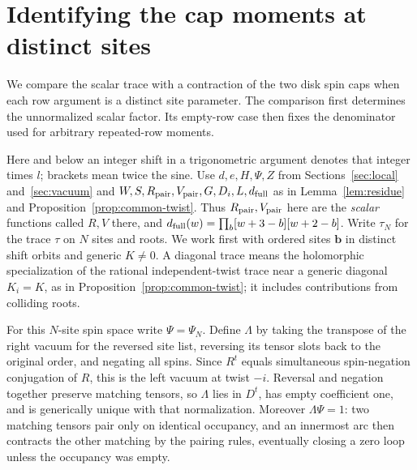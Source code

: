 \section{Identifying the cap moments at distinct sites}\label{sec:site-moments}

We compare the scalar trace with a contraction of the two disk spin caps when each row argument is a distinct site parameter. The comparison first determines the unnormalized scalar factor. Its empty-row case then fixes the denominator used for arbitrary repeated-row moments.

Here and below an integer shift in a trigonometric argument denotes that integer times \(l\); brackets mean twice the sine. Use \(d,e,H,\Psi,Z\) from Sections~\ref{sec:local} and~\ref{sec:vacuum} and \(W,S,R_{\rm pair},V_{\rm pair},G,D_i,L,d_{\rm full}\) as in Lemma~\ref{lem:residue} and Proposition~\ref{prop:common-twist}. Thus \(R_{\rm pair},V_{\rm pair}\) here are the \emph{scalar} functions called \(R,V\) there, and \(d_{\rm full}(w)=\prod_b[w+3-b][w+2-b]\). Write \(\tau_N\) for the trace \(\tau\) on \(N\) sites and roots. We work first with ordered sites \(\mathbf b\) in distinct shift orbits and generic \(K\ne0\). A diagonal trace means the holomorphic specialization of the rational independent-twist trace near a generic diagonal \(K_i=K\), as in Proposition~\ref{prop:common-twist}; it includes contributions from colliding roots.

For this \(N\)-site spin space write \(\Psi=\Psi_N\). Define \(\Lambda\) by taking the transpose of the right vacuum for the reversed site list, reversing its tensor slots back to the original order, and negating all spins. Since \(R^t\) equals simultaneous spin-negation conjugation of \(R\), this is the left vacuum at twist \(-i\). Reversal and negation together preserve matching tensors, so \(\Lambda\) lies in \(D^t\), has empty coefficient one, and is generically unique with that normalization. Moreover \(\Lambda\Psi=1\): two matching tensors pair only on identical occupancy, and an innermost arc then contracts the other matching by the pairing rules, eventually closing a zero loop unless the occupancy was empty.

